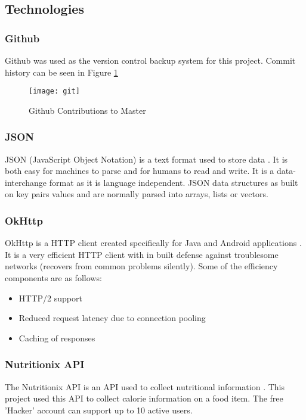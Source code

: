 \tocless\subsection{Technologies}

\tocless\subsubsection{Github}
Github was used as the version control backup system for this project.
Commit history can be seen in Figure \ref{fig:git}

\begin{figure}[h]
    \texttt{[image: git]}
    \caption{Github Contributions to Master}
    \label{fig:git}
\end{figure}

\tocless\subsubsection{JSON}
JSON (JavaScript Object Notation) is a text format used to store data \parencite{json}.
It is both easy for machines to parse and for humans to read and write.
It is a data-interchange format as it is language independent.
JSON data structures as built on key pairs values and are normally parsed into arrays, lists or vectors.

\tocless\subsubsection{OkHttp}
OkHttp is a HTTP client created specifically for Java and Android applications \parencite{okhttp}.
It is a very efficient HTTP client with in built defense against troublesome networks (recovers from common problems silently).
Some of the efficiency components are as follows:
\begin{itemize}
    \item{HTTP/2 support}
    \item{Reduced request latency due to connection pooling}
    \item{Caching of responses}
\end{itemize}

\tocless\subsubsection{Nutritionix API}
The Nutritionix API is an API used to collect nutritional information \parencite{nutritionix}.
This project used this API to collect calorie information on a food item.
The free 'Hacker' account can support up to 10 active users.

